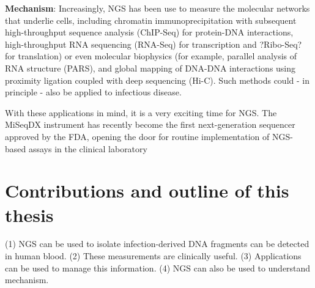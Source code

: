\textbf{Mechanism}: Increasingly, NGS has been use to measure the molecular networks that underlie cells, including chromatin immunoprecipitation with subsequent high-throughput sequence analysis (ChIP-Seq) for protein-DNA interactions, high-throughput RNA sequencing (RNA-Seq) for transcription and ?Ribo-Seq? for translation) or even molecular biophysics (for example, parallel analysis of RNA structure (PARS), and global mapping of DNA-DNA interactions using proximity ligation coupled with deep sequencing (Hi-C). Such methods could - in principle - also be applied to infectious disease. 

With these applications in mind, it is a very exciting time for NGS. The MiSeqDX instrument has recently become the first next-generation sequencer approved by the FDA, opening the door for routine implementation of NGS-based assays in the clinical laboratory 

\section{Contributions and outline of this thesis}

(1) NGS can be used to isolate infection-derived DNA fragments can be detected in human blood. (2) These measurements are clinically useful.
(3) Applications can be used to manage this information. (4) NGS can also be used to understand mechanism.
